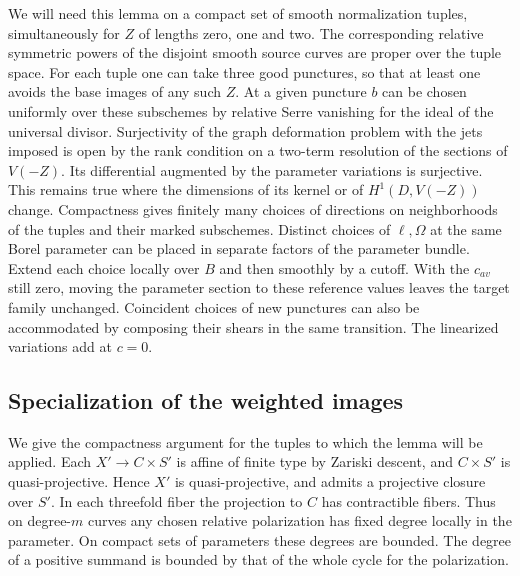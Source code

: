 We will need this lemma on a compact set of smooth normalization
tuples, simultaneously for $Z$ of lengths zero, one and two.
The corresponding relative symmetric powers of the disjoint smooth
source curves are proper over the tuple space. For each tuple
one can take three good punctures, so that at least one avoids the
base images of any such $Z$. At a given puncture $b$ can be chosen
uniformly over these subschemes by relative Serre vanishing for the
ideal of the universal divisor. Surjectivity of the graph deformation
problem with the jets imposed is open by the rank condition on a two-term
resolution of the sections of $V(-Z)$. Its differential augmented by
the parameter variations is surjective. This remains true where the dimensions of
its kernel or of $H^1(D,V(-Z))$ change. Compactness gives finitely
many choices of directions on neighborhoods of the tuples and their
marked subschemes. Distinct choices of $\ell,\Omega$ at the same
Borel parameter can be placed in separate factors of the parameter
bundle. Extend each choice locally over $B$ and then smoothly by a
cutoff. With the $c_{av}$ still zero, moving the parameter section to
these reference values leaves the target family unchanged. Coincident
choices of new punctures can also be accommodated by composing their
shears in the same transition. The linearized variations add at $c=0$.

\subsection{Specialization of the weighted images}

We give the compactness argument for the tuples to which the lemma
will be applied. Each $X'\to C\times S'$ is affine of finite type by
Zariski descent, and $C\times S'$ is quasi-projective. Hence $X'$ is
quasi-projective, and admits a projective closure over $S'$. In each
threefold fiber the projection to $C$ has contractible fibers. Thus
on degree-$m$ curves any chosen relative polarization has fixed
degree locally in the parameter. On compact sets of parameters these
degrees are bounded. The degree of a positive summand is bounded by
that of the whole cycle for the polarization.

